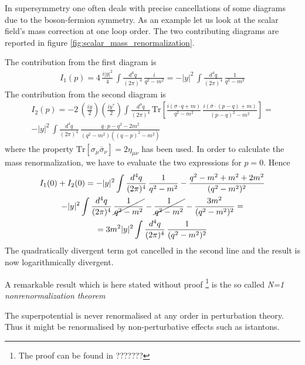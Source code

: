 \documentclass[12pt]{article}
\begin{document}
In supersymmetry one often deals with precise cancellations of some diagrams due to the boson-fermion symmetry. As an example let us look at the scalar field's mass correction at one loop order. The two contributing diagrams are reported in figure \ref{fig:scalar_mass_renormalization}.
\raggedright The contribution from the first diagram is
\begin{gather*}
  I_1(p) = 4 \,\frac{i|y|^2}{4} \, \int \frac{d^4 q}{(2\pi)^4} \, \frac{i}{q^2 - m^2} = - |y|^2 \, \int \frac{d^4 q}{(2\pi)^4} \, \frac{1}{q^2 - m^2}
\end{gather*}
The contribution from the second diagram is 
\begin{gather*}
  I_2(p) = - 2 \, \left(\frac{iy}{2}\right)\left(\frac{iy^*}{2}\right) \int \frac{d^4 q}{(2\pi)^4} \, \text{Tr}\left[\frac{i(\sigma \cdot q + m)}{q^2 - m^2} \, \frac{i(\bar\sigma \cdot (p-q) + m)}{(p-q)^2 - m^2}\right] = \\
  - |y|^2 \, \int \frac{d^4 q}{(2\pi)^4} \, \frac{q\cdot p - q^2 - 2m^2}{(q^2-m^2) ((q-p)^2-m^2)}
\end{gather*}
where the property $\text{Tr}[\sigma_\mu \bar\sigma_\nu] = 2\eta_{\mu\nu}$ has been used. In order to calculate the mass renormalization, we have to evaluate the two expressions for $p=0$. Hence
\begin{gather*}
  I_1(0) + I_2(0) = -|y|^2 \int \frac{d^4q}{(2\pi)^4} \, \frac{1}{q^2-m^2} - \frac{q^2 -m^2 + m^2 + 2m^2}{(q^2-m^2)^2} \\
  -|y|^2 \int \frac{d^4q}{(2\pi)^4} \, \cancel{\frac{1}{q^2-m^2}} - \cancel{\frac{1}{q^2-m^2}} - \frac{3m^2}{(q^2-m^2)^2}= \\ 
  = 3m^2|y|^2 \int \frac{d^4q}{(2\pi)^4} \, \frac{1}{(q^2-m^2)^2}
\end{gather*}
The quadratically divergent term got cancelled in the second line and the result is now logarithmically divergent. \par 
\vspace{15pt}
A remarkable result which is here stated without proof \footnote{The proof can be found in ???????} is the so called \emph{N=1 nonrenormalization theorem}
\begin{center}
  The superpotential is never renormalised at any order in perturbation theory. Thus it might be renormalised by non-perturbative effects such as istantons.
\end{center}

\newpage 
\end{document}
